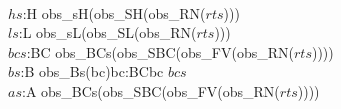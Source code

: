 {\newcommand{\isminus}{-3mm}


\HHHH\label{p-ch.Running Systems}

\bp
{}\\
\>\ $hs$:H {\IS} {\IS} obs\_sH(obs\_SH(obs\_RN($rts$)))\ \ \ \\
\>\ $ls$:L {\IS} {\IS} obs\_sL(obs\_SL(obs\_RN($rts$)))\\
\>\ $bcs$:BC {\IS} obs\_BCs(obs\_SBC(obs\_FV(obs\_RN($rts$))))\ \ \ \\
\>\ $bs$:B {\IS} {\UNION}{\LBRACE}obs\_Bs(bc){\BAR}bc:BC{\RDOT}bc {\ISIN} $bcs${\RBRACE}\ \ \ \\
\>\ $as$:A {\IS} obs\_BCs(obs\_SBC(obs\_FV(obs\_RN($rts$))))
\ep

\HHHH\LLLL

}
